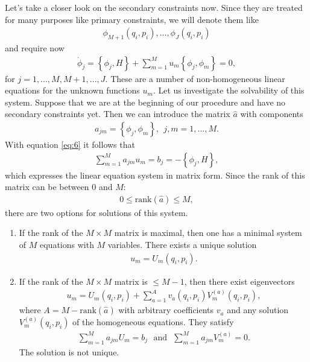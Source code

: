 Let's take a closer look on the secondary constraints now. Since they are treated for many purposes like primary constraints, we will denote them like
\begin{align}
\phi_{M+1}(q_i,p_i), ... , \phi_J(q_i,p_i)
\end{align}
and require now 
\begin{align}\label{eq:6}
\dot{\phi}_j = \left \{ \phi_j,H \right \} + \sum_{m=1}^M u_m  \left \{ \phi_j,\phi_m \right \} = 0, 
\end{align}
for $j=1,...,M,M+1,...,J$. These are a number of non-homogeneous linear equations for the unknown functions $u_m$. Let us investigate the solvability of this system. Suppose that we are at the beginning of our procedure and have no secondary constraints yet. Then we can introduce the matrix $\hat{a}$ with components
\begin{align}
a_{jm} = \left \{ \phi_j,\phi_m \right \}, \ \ j,m = 1, \dots, M.
\end{align}
With equation \eqref{eq:6} it follows that
\begin{align}
\sum_{m=1}^M a_{jm} u_m = b_j = - \left \{ \phi_j,H \right \},
\end{align}
which expresses the linear equation system in matrix form. Since the rank of this matrix can be between 0 and $M$:
\begin{align}
0 \leq \text{rank} (\hat{a}) \leq M,
\end{align}
there are two options for solutions of this system. 

\pagebreak

\begin{enumerate}
\item If the rank of the $M \times M$ matrix is maximal, then one has a minimal system of $M$ equations with $M$ variables.
There exists a unique solution 
\begin{align}
u_m = U_m(q_i,p_i).
\end{align}
\item If the rank of the $M \times M$ matrix is $\leq M-1$, then there exist eigenvectors
\begin{align}\label{eq:7}
u_m = U_m(q_i,p_i) + \sum_{a=1}^A v_a(q_i,p_i) V_m^{(a)}(q_i,p_i),
\end{align}
where $A = M - \text{rank} (\hat{a})$ with arbitrary coefficients $v_a$ and any solution $V_m^{(a)}(q_i,p_i)$ of the homogeneous equations. They satisfy 
\begin{align}
\sum_{m=1}^M a_{jm} U_m = b_j \ \ \ \text{and} \ \ \ \sum_{m=1}^M a_{jm} V_m^{(a)} = 0.
\end{align}
The solution is not unique.
\end{enumerate}

